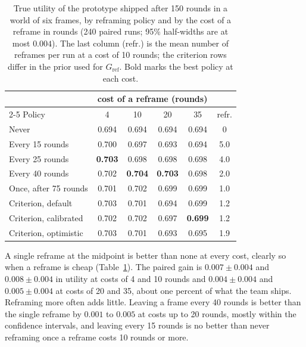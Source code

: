 \documentclass[10pt,twocolumn]{article}
\theoremstyle{definition}
\begin{document}
\begin{table}[t]
\caption{True utility of the prototype shipped after 150 rounds in a world of six frames, by reframing policy and by the cost of a reframe in rounds (240 paired runs; 95\% half-widths are at most $0.004$). The last column (refr.) is the mean number of reframes per run at a cost of 10 rounds; the criterion rows differ in the prior used for $G_{\mathrm{ref}}$. Bold marks the best policy at each cost.}
\label{tab:reframe}
\centering\small
\setlength{\tabcolsep}{3.4pt}
\begin{tabular}{@{}lccccc@{}}
\toprule
& \multicolumn{4}{c}{cost of a reframe (rounds)} & \\
\cmidrule(lr){2-5}
Policy & 4 & 10 & 20 & 35 & refr.\\
\midrule
Never & 0.694 & 0.694 & 0.694 & 0.694 & 0\\
\addlinespace[2pt]
Every 15 rounds & 0.700 & 0.697 & 0.693 & 0.694 & 5.0\\
Every 25 rounds & \textbf{0.703} & 0.698 & 0.698 & 0.698 & 4.0\\
Every 40 rounds & 0.702 & \textbf{0.704} & \textbf{0.703} & 0.698 & 2.0\\
Once, after 75 rounds & 0.701 & 0.702 & 0.699 & 0.699 & 1.0\\
\addlinespace[2pt]
Criterion, default & 0.703 & 0.701 & 0.694 & 0.699 & 1.2\\
Criterion, calibrated & 0.702 & 0.702 & 0.697 & \textbf{0.699} & 1.2\\
Criterion, optimistic & 0.703 & 0.701 & 0.693 & 0.695 & 1.9\\
\bottomrule
\end{tabular}
\end{table}

A single reframe at the midpoint is better than none at every cost, clearly so when a reframe is cheap (Table~\ref{tab:reframe}). The paired gain is $0.007\pm0.004$ and $0.008\pm0.004$ in utility at costs of 4 and 10 rounds and $0.004\pm0.004$ and $0.005\pm0.004$ at costs of 20 and 35, about one percent of what the team ships. Reframing more often adds little. Leaving a frame every 40 rounds is better than the single reframe by $0.001$ to $0.005$ at costs up to 20 rounds, mostly within the confidence intervals, and leaving every 15 rounds is no better than never reframing once a reframe costs 10 rounds or more.
\end{document}
